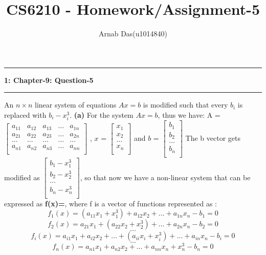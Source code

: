 \documentclass{article}
\title{CS6210 - Homework/Assignment-5}
\author{Arnab Das(u1014840)}
\newcommand\question[2]{\vspace{.25in}\hrule\textbf{#1: #2}\hrule\vspace{.10in}}
\renewcommand\part[1]{\vspace{.10in}\textbf{(#1)}}
\begin{document}
  \maketitle
  \newpage
  \newcommand\NAME{ARNAB DAS}
  \newcommand\UID{uxxxxxxx}
  \newcommand\HWNUM{4}



\question{1}{Chapter-9: Question-5}
An $n \times n$ linear system of equations $Ax=b$ is modified such that every $b_i$ is replaced with $b_i - x_i^3$. \newline\part{a} For the system $Ax=b$, thus we have: \newline
A = $\begin{bmatrix}
	a_{11} & a_{12} & a_{13} & \dots & a_{1n} \\
	a_{21} & a_{22} & a_{23} & \dots & a_{2n} \\
	\dots & \dots & \dots & \dots & \dots \\
	a_{n1} & a_{n2} & a_{n3} & \dots & a_{nn} \\
\end{bmatrix}$ , $x$ = $\begin{bmatrix}
			x_1 \\
			x_2 \\
			\dots \\
			x_n \\
\end{bmatrix}$ and $b$ = $\begin{bmatrix}
			b_1 \\
			b_2 \\
			\dots \\
			b_n \\
			\end{bmatrix}$ \newline
The b vector gets modified as $\begin{bmatrix} 
				b_1 - x_1^3 \\
				b_2 - x_2^3 \\
				\dots \\
				b_n - x_n^3 \\
\end{bmatrix}$, so that now we have a non-linear system that can be expressed as \textbf {f(x)=}, where f is a vector of functions represented as :
\[ f_1(x) = (a_{11}x_1 + x_1^3) + a_{12}x_2 + \dots + a_{1n}x_n - b_1 = 0\]
\[ f_2(x) = a_{21}x_1 + (a_{22}x_2 + x_2^3) + \dots + a_{2n}x_n - b_2 = 0\]
\[ \dots \]
\[ f_i(x) = a_{i1}x_1 + a_{i2}x_2 + \dots + (a_{ii}x_i + x_i^3) + \dots + a_{in}x_n - b_i = 0\]
\[ \dots \]
\[ f_n(x) = a_{n1}x_1 + a_{n2}x_2 + \dots + a_{nn}x_n + x_n^3 - b_n = 0\]
\end{document}
